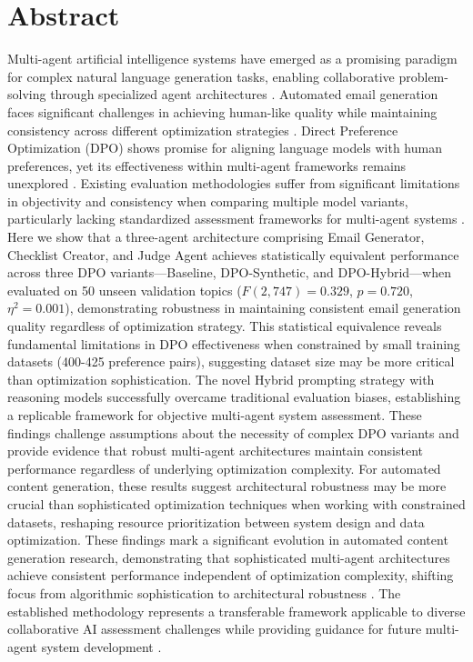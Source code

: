 \chapter*{\Large \center Abstract}


Multi-agent artificial intelligence systems have emerged as a promising paradigm for complex natural language generation tasks, enabling collaborative problem-solving through specialized agent architectures \cite{yan2025beyond_selftalk, guo2024llm_multiagent}. Automated email generation faces significant challenges in achieving human-like quality while maintaining consistency across different optimization strategies \cite{zhang2019email_subject, chen2019gmail_smart_compose}. Direct Preference Optimization (DPO) shows promise for aligning language models with human preferences, yet its effectiveness within multi-agent frameworks remains unexplored \cite{rafailov2023dpo, muldrew2024active_preference}. Existing evaluation methodologies suffer from significant limitations in objectivity and consistency when comparing multiple model variants, particularly lacking standardized assessment frameworks for multi-agent systems \cite{ye2024justice_prejudice, gu2024llm_judge_survey}. Here we show that a three-agent architecture comprising Email Generator, Checklist Creator, and Judge Agent achieves statistically equivalent performance across three DPO variants—Baseline, DPO-Synthetic, and DPO-Hybrid—when evaluated on 50 unseen validation topics ($F(2,747) = 0.329$, $p = 0.720$, $\eta^2 = 0.001$), demonstrating robustness in maintaining consistent email generation quality regardless of optimization strategy. This statistical equivalence reveals fundamental limitations in DPO effectiveness when constrained by small training datasets (400-425 preference pairs), suggesting dataset size may be more critical than optimization sophistication. The novel Hybrid prompting strategy with reasoning models successfully overcame traditional evaluation biases, establishing a replicable framework for objective multi-agent system assessment. These findings challenge assumptions about the necessity of complex DPO variants and provide evidence that robust multi-agent architectures maintain consistent performance regardless of underlying optimization complexity. For automated content generation, these results suggest architectural robustness may be more crucial than sophisticated optimization techniques when working with constrained datasets, reshaping resource prioritization between system design and data optimization. These findings mark a significant evolution in automated content generation research, demonstrating that sophisticated multi-agent architectures achieve consistent performance independent of optimization complexity, shifting focus from algorithmic sophistication to architectural robustness \cite{ferrag2025llm_autonomous_agents, liu2024advances_foundation_agents}. The established methodology represents a transferable framework applicable to diverse collaborative AI assessment challenges while providing guidance for future multi-agent system development \cite{masterman2024landscape_emerging, sapkota2025ai_agents_agentic}.